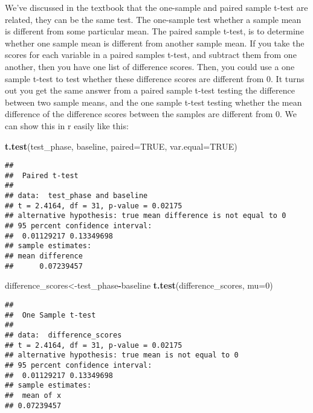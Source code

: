 \documentclass[
]{book}
\newenvironment{Shaded}{\begin{snugshade}}{\end{snugshade}}
\newcommand{\AttributeTok}[1]{\textcolor[rgb]{0.13,0.29,0.53}{#1}}
\newcommand{\ConstantTok}[1]{\textcolor[rgb]{0.56,0.35,0.01}{#1}}
\newcommand{\DecValTok}[1]{\textcolor[rgb]{0.00,0.00,0.81}{#1}}
\newcommand{\FunctionTok}[1]{\textcolor[rgb]{0.13,0.29,0.53}{\textbf{#1}}}
\newcommand{\NormalTok}[1]{#1}
\newcommand{\OtherTok}[1]{\textcolor[rgb]{0.56,0.35,0.01}{#1}}
\newcommand{\SpecialCharTok}[1]{\textcolor[rgb]{0.81,0.36,0.00}{\textbf{#1}}}
\begin{document}
We've discussed in the textbook that the one-sample and paired sample t-test are related, they can be the same test. The one-sample test whether a sample mean is different from some particular mean. The paired sample t-test, is to determine whether one sample mean is different from another sample mean. If you take the scores for each variable in a paired samples t-test, and subtract them from one another, then you have one list of difference scores. Then, you could use a one sample t-test to test whether these difference scores are different from 0. It turns out you get the same answer from a paired sample t-test testing the difference between two sample means, and the one sample t-test testing whether the mean difference of the difference scores between the samples are different from 0. We can show this in r easily like this:

\begin{Shaded}
\begin{Highlighting}[]
\FunctionTok{t.test}\NormalTok{(test\_phase, baseline, }\AttributeTok{paired=}\ConstantTok{TRUE}\NormalTok{, }\AttributeTok{var.equal=}\ConstantTok{TRUE}\NormalTok{)}
\end{Highlighting}
\end{Shaded}

\begin{verbatim}
## 
##  Paired t-test
## 
## data:  test_phase and baseline
## t = 2.4164, df = 31, p-value = 0.02175
## alternative hypothesis: true mean difference is not equal to 0
## 95 percent confidence interval:
##  0.01129217 0.13349698
## sample estimates:
## mean difference 
##      0.07239457
\end{verbatim}

\begin{Shaded}
\begin{Highlighting}[]
\NormalTok{difference\_scores}\OtherTok{\textless{}{-}}\NormalTok{test\_phase}\SpecialCharTok{{-}}\NormalTok{baseline}
\FunctionTok{t.test}\NormalTok{(difference\_scores, }\AttributeTok{mu=}\DecValTok{0}\NormalTok{)}
\end{Highlighting}
\end{Shaded}

\begin{verbatim}
## 
##  One Sample t-test
## 
## data:  difference_scores
## t = 2.4164, df = 31, p-value = 0.02175
## alternative hypothesis: true mean is not equal to 0
## 95 percent confidence interval:
##  0.01129217 0.13349698
## sample estimates:
##  mean of x 
## 0.07239457
\end{verbatim}
\end{document}
